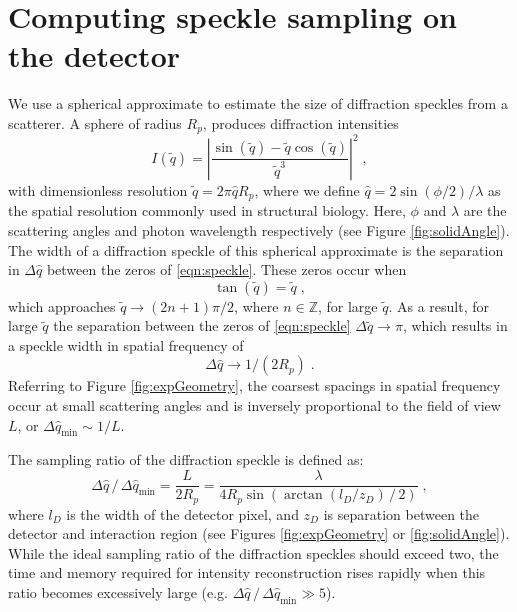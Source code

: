 \documentclass[]{iucr}              %
\begin{document}
\section{Computing speckle sampling on the detector}\label{sec:speckle}
We use a spherical approximate to estimate the size of diffraction speckles from a scatterer. A sphere of radius $R_p$, produces diffraction intensities 
\begin{equation}
I(\widetilde{q}) = \left|\frac{\sin(\widetilde{q}) - \widetilde{q} \cos(\widetilde{q})} {\widetilde{q}^3} \right|^2 \;, \label{eqn:speckle}
\end{equation}
with dimensionless resolution $\widetilde{q} = 2 \pi \widehat{q} R_p$, where we define $\widehat{q} = 2 \sin(\phi/2) / \lambda$ as the spatial resolution commonly used in structural biology. Here, $\phi$ and $\lambda$ are the scattering angles and photon wavelength respectively (see Figure \ref{fig:solidAngle}). The width of a diffraction speckle of this spherical approximate is the separation in $\Delta \widehat{q} $ between the zeros of \eqref{eqn:speckle}. These zeros occur when 
\begin{equation}
\tan(\widetilde{q}) = \widetilde{q} \;,
\end{equation}
which approaches $\widetilde{q} \to (2n+1) \pi / 2$, where $n \in \mathbb{Z}$, for large $\widetilde{q}$. As a result, for large $\widetilde{q}$ the separation between the zeros of \eqref{eqn:speckle} $\Delta \widetilde{q} \to \pi$, which results in a speckle width in spatial frequency of 
\begin{equation}
\Delta \widehat{q} \to 1/(2 R_p) \;. 
\end{equation}
Referring to Figure \ref{fig:expGeometry}, the coarsest spacings in spatial frequency occur at small scattering angles and is inversely proportional to the field of view $L$, or $\Delta \widehat{q}_{\text{min}} \sim 1/L$. 

The sampling ratio of the diffraction speckle is defined as:
\begin{equation}
\Delta \widehat{q} \,/\, \Delta \widehat{q}_{\text{min}} = \frac{L}{2R_p} = \frac{\lambda}{4 R_p \sin\left( \arctan (l_D / z_D) \,/\,2 \right)}\; ,
\end{equation}
where $l_D$ is the width of the detector pixel, and $z_D$ is separation between the detector and interaction region (see Figures \ref{fig:expGeometry} or \ref{fig:solidAngle}). While the ideal sampling ratio of the diffraction speckles should exceed two, the time and memory required for intensity reconstruction rises rapidly when this ratio becomes excessively large (e.g. $ \Delta \widehat{q} \,/\, \Delta \widehat{q}_{\text{min}} \gg 5$). 
\end{document}
